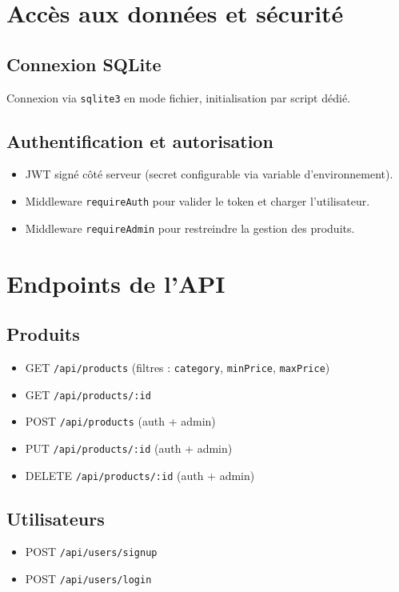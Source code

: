 \documentclass[12pt,a4paper]{report}
\begin{document}
\chapter{Accès aux données et sécurité}
\section{Connexion SQLite}
Connexion via \texttt{sqlite3} en mode fichier, initialisation par script dédié.

\section{Authentification et autorisation}
\begin{itemize}
  \item JWT signé côté serveur (secret configurable via variable d'environnement).
  \item Middleware \texttt{requireAuth} pour valider le token et charger l'utilisateur.
  \item Middleware \texttt{requireAdmin} pour restreindre la gestion des produits.
\end{itemize}

\chapter{Endpoints de l'API}
\section{Produits}
\begin{itemize}
  \item GET \texttt{/api/products} (filtres : \texttt{category}, \texttt{minPrice}, \texttt{maxPrice})
  \item GET \texttt{/api/products/:id}
  \item POST \texttt{/api/products} (auth + admin)
  \item PUT \texttt{/api/products/:id} (auth + admin)
  \item DELETE \texttt{/api/products/:id} (auth + admin)
\end{itemize}

\section{Utilisateurs}
\begin{itemize}
  \item POST \texttt{/api/users/signup}
  \item POST \texttt{/api/users/login}
\end{itemize}
\end{document}
